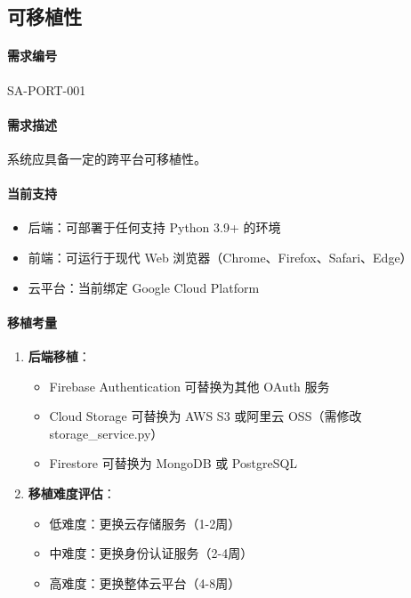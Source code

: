 \subsection{可移植性}

\paragraph{需求编号} SA-PORT-001

\paragraph{需求描述} 系统应具备一定的跨平台可移植性。

\paragraph{当前支持}
\begin{itemize}
    \item 后端：可部署于任何支持 Python 3.9+ 的环境
    \item 前端：可运行于现代 Web 浏览器（Chrome、Firefox、Safari、Edge）
    \item 云平台：当前绑定 Google Cloud Platform
\end{itemize}

\paragraph{移植考量}
\begin{enumerate}
    \item \textbf{后端移植}：
          \begin{itemize}
              \item Firebase Authentication 可替换为其他 OAuth 服务
              \item Cloud Storage 可替换为 AWS S3 或阿里云 OSS（需修改 storage\_service.py）
              \item Firestore 可替换为 MongoDB 或 PostgreSQL
          \end{itemize}

    \item \textbf{移植难度评估}：
          \begin{itemize}
              \item 低难度：更换云存储服务（1-2周）
              \item 中难度：更换身份认证服务（2-4周）
              \item 高难度：更换整体云平台（4-8周）
          \end{itemize}
\end{enumerate}

